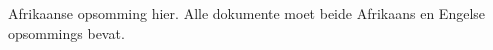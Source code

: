 
\begin{uittreksel}    %

Afrikaanse opsomming hier. Alle dokumente moet beide Afrikaans en Engelse opsommings bevat.

\end{uittreksel}